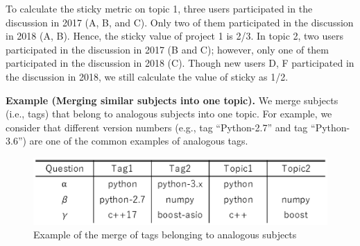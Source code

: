 \documentclass[conference]{IEEEtran}
\begin{document}
To calculate the sticky metric on topic 1, three users participated in the discussion in 2017 (A, B, and C). Only two of them participated in the discussion in 2018 (A, B). Hence, the sticky value of project 1 is 2/3. In topic 2, two users participated in the discussion in 2017 (B and C); however, only one of them participated in the discussion in 2018 (C). Though new users D, F participated in the discussion in 2018, we still calculate the value of sticky as 1/2.

\noindent
\textbf{Example (Merging similar subjects into one topic).}
We merge subjects (i.e., tags) that belong to analogous subjects into one topic. For example, we consider that different version numbers (e.g., tag “Python-2.7” and tag “Python-3.6”) are one of the common examples of analogous tags. 

\begin{figure}[t]
 \centering
 \includegraphics[width=0.80\hsize]{img/ff2.eps}  
 \caption{Example of the merge of tags belonging to analogous subjects} 
 \label{fig:example2} 
\end{figure}
\end{document}

